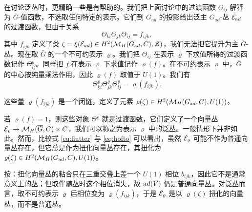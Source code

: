 在讨论泛丛时，更精确一些是有帮助的。我们把上面讨论中的过渡函数 $\Theta_{ij}$ 解释为 $\bar G$-值函数，不选取任何特定的表示。它们到 $G_{ad}$ 的投影给出泛主 $G_{ad}$-丛 ${\EUE}_{\rm ad}$ 的过渡函数，但由于关系
\setcounter{equation}{15}
\begin{equation}\label{eq:flutter}
\Theta_{ki}\Theta_{jk}\Theta_{ij}=f_{ijk},
\end{equation}
其中 $f_{ijk}$ 定义了类 $\zeta=\xi({\EUE}_{ad})\in H^2(\MH(G_{\rm ad},C),\CZ)$，我们无法把它提升为主 $\bar G$-丛。现在取 $\bar G$ 的一个不可约表示 $\varrho$。我们把 $\Theta_{ij}$ 在表示 $\varrho$ 下求值所得的过渡函数记作 $\Theta_{ij}^\varrho$。同样把 $f$ 在表示 $\varrho$ 下求值记作 $\varrho(f)$。在不可约表示 $\varrho$ 中，$\bar G$ 的中心按纯量乘法作用，因此 $\varrho(f)$ 取值于 $U(1)$。我们有
\setcounter{equation}{16}
\begin{equation}\label{eq:glutter}
\Theta^\varrho_{ki}\Theta^\varrho_{jk}\Theta^\varrho_{ij}=\varrho(f_{ijk}).
\end{equation}

这些量 $\varrho(f_{ijk})$ 是一个闭链，定义了元素 $\varrho(\zeta)\in H^2(\MH(G_{\rm ad},C),U(1))$。

若 $\varrho(f)=1$，则这些对象 $\Theta^\varrho$ 就是过渡函数，它们定义了一个向量丛 ${\EUE}_\varrho\to \MH(\bar G,C)\times C$，我们可以称之为表示 $\varrho$ 中的泛丛。一般情形下并非如此。然而，比较式 \eqref{eq:flutter} 与 \eqref{eq:hofto} 可以看出，虽然 ${\EUE}_\varrho$ 可能不作为普通向量丛存在，但它总是作为扭化向量丛存在，其扭化为 $\varrho(\zeta)\in H^2(\MH(G_{\rm ad},C),U(1))$。

\begin{yizhu}[易错点]
按：扭化向量丛的粘合只在三重交叠上差一个 $U(1)$ 相位 $b_{ijk}$，因此它不是通常意义上的丛；但取伴随丛时这个相位消失，故 ${\rm ad}(V)$ 仍是普通向量丛。对泛丛而言，取不可约表示 $\varrho$ 后相位变为 $\varrho(f_{ijk})$，于是 ${\EUE}_\varrho$ 是以 $\varrho(\zeta)$ 扭化的向量丛，而不是普通丛。
\end{yizhu}
